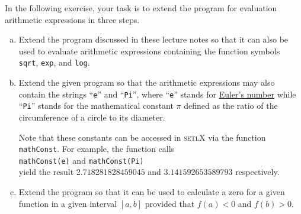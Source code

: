 \exercise
In the following exercise, your task is to extend the program for evaluation arithmetic expressions in three steps.
\begin{enumerate}[(a)]
\item Extend the program discussed in these lecture notes so that it can also be used to evaluate
      arithmetic expressions containing the function symbols
      \\[0.2cm]
      \hspace*{1.3cm}
      \texttt{sqrt}, \texttt{exp}, and \texttt{log}.
\item Extend the given program so that the arithmetic expressions may also contain 
      the strings ``\texttt{e}'' and ``\texttt{Pi}'', where ``\texttt{e}'' stands for 
      \href{http://en.wikipedia.org/wiki/E_(mathematical_constant)}{Euler's number} 
      while ``\texttt{Pi}'' stands for the mathematical constant
      \href{http://en.wikipedia.org/wiki/Pi}{$\pi$} defined as the ratio of the circumference of a
      circle to its diameter. 

      Note that these constants can be accessed in \textsc{setlX} via the function \texttt{mathConst}.
      For example, the function calls
      \\[0.2cm]
      \hspace*{1.3cm}
      \texttt{mathConst(e)} \quad and \quad
      \texttt{mathConst(Pi)} 
      \\[0.2cm]
      yield the result $2.718281828459045$ and $3.141592653589793$ respectively.
\item Extend the program so that it can be used to calculate a zero for a given function in a given
      interval $[a,b]$ provided that $f(a) < 0$ and $f(b) > 0$.  
      \eox
\end{enumerate}



